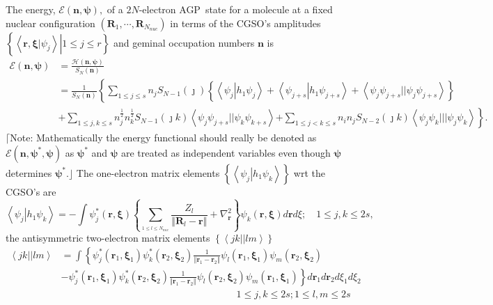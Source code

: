 \documentclass[titlepage]{article}%
\begin{document}
The energy, $\mathcal{E}\left(  \bm{n,\psi}\right)  ,$ of a $2N$-electron
AGP\ state for a molecule at a fixed nuclear configuration $\left(
\bm{R}_{1},\cdots,\bm{R}_{N_{nuc}}\right)  $ in terms of the CGSO's amplitudes
$\left\{  \left.  \left\langle \left.  \bm{r,\xi}\right\vert \psi
_{j}\right\rangle \right\vert 1\leq j\leq r\right\}  $ and geminal occupation
numbers $\bm{n}$ is
\begin{align}
\mathcal{E}\left(  \bm{n,\psi}\right)   &  =\frac{\mathcal{H}\left(
\bm{n,\psi}\right)  }{S_{N}\left(  \bm{n}\right)  }\nonumber\\
&  =\frac{1}{S_{N}\left(  \bm{n}\right)  }\left\{  \sum_{1\leq j\leq s}%
n_{j}S_{N-1}\left(  \jmath\right)  \left\{  \left\langle \psi_{j}\left\vert
h_{1}\psi_{j}\right.  \right\rangle +\left\langle \psi_{j+s}\left\vert
h_{1}\psi_{j+s}\right.  \right\rangle +\left\langle \psi_{j}\psi_{j+s}%
||\psi_{j}\psi_{j+s}\right\rangle \right\}  \right. \nonumber\\
&  +\sum_{1\leq j,k\leq s}n_{j}^{\frac{1}{2}}n_{k}^{\frac{1}{2}}S_{N-1}\left(
\jmath k\right)  \left\langle \psi_{j}\psi_{j+s}||\psi_{k}\psi_{k+s}%
\right\rangle \left.  +\sum_{1\leq j<k\leq s}n_{i}n_{j}S_{N-2}\left(  \jmath
k\right)  \left\langle \psi_{j}\psi_{k}|||\psi_{j}\psi_{k}\right\rangle
\right\}  . \label{energy}%
\end{align}
$\lceil$Note: Mathematically the energy functional should really be denoted as
$\mathcal{E}\left(  \bm{n,\psi}^{\ast}\bm{,\psi}\right)  $ as $\bm{\psi}^{\ast
}$ and $\bm{\psi}$ are treated as independent variables even though
$\bm{\psi}$ determines $\bm{\psi}^{\ast}$.$\rfloor$ The one-electron matrix
elements $\left\{  \left\langle \psi_{j}\left\vert h_{1}\psi_{k}\right.
\right\rangle \right\}  $ wrt the CGSO's are
\begin{equation}
\left\langle \psi_{j}\left\vert h_{1}\psi_{k}\right.  \right\rangle =-\int
\psi_{j}^{\ast}\left(  \bm{r,\xi}\right)  \left\{  \sum_{_{1\leq l\leq
N_{nuc}}}\frac{Z_{l}}{\left\Vert \bm{R}_{l}-\bm{r}\right\Vert }+\nabla
_{\bm{r}}^{2}\right\}  \psi_{k}\left(  \bm{r,\xi}\right)  d\bm{r}d\xi
;\quad1\leq j,k\leq2s, \label{h1}%
\end{equation}
the antisymmetric two-electron matrix elements $\left\{  \left\langle
jk||lm\right\rangle \right\}  $
\begin{align}
\left\langle jk||lm\right\rangle  &  =\int\left\{  \psi_{j}^{\ast}\left(
\bm{r}_{1}\bm{,\xi}_{1}\right)  \psi_{k}^{\ast}\left(  \bm{r}_{2}%
\bm{,\xi}_{2}\right)  \frac{1}{\left\Vert \bm{r}_{1}-\bm{r}_{2}\right\Vert
}\psi_{l}\left(  \bm{r}_{1}\bm{,\xi}_{1}\right)  \psi_{m}\left(
\bm{r}_{2}\bm{,\xi}_{2}\right)  \right. \nonumber\\
&  -\left.  \psi_{j}^{\ast}\left(  \bm{r}_{1}\bm{,\xi}_{1}\right)  \psi
_{k}^{\ast}\left(  \bm{r}_{2}\bm{,\xi}_{2}\right)  \frac{1}{\left\Vert
\bm{r}_{1}-\bm{r}_{2}\right\Vert }\psi_{l}\left(  \bm{r}_{2}\bm{,\xi}_{2}%
\right)  \psi_{m}\left(  \bm{r}_{1}\bm{,\xi}_{1}\right)  \right\}
d\bm{r}_{1}d\bm{r}_{2}d\xi_{1}d\xi_{2}\nonumber\\
&  \left.  {}\right.  \qquad\qquad\qquad\qquad\qquad\qquad\qquad\qquad
\qquad1\leq j,k\leq2s;1\leq l,m\leq2s \label{h2}%
\end{align}
\end{document}
